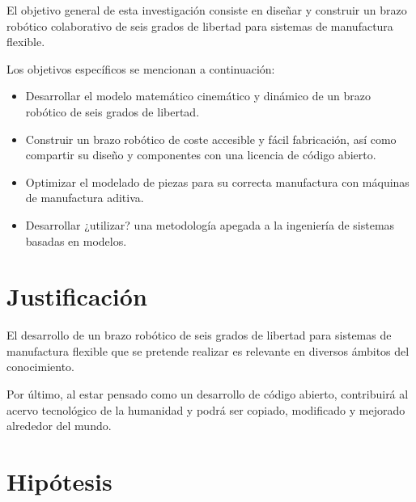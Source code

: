 El objetivo general de esta investigación consiste en diseñar y construir un brazo robótico colaborativo de seis grados de libertad para sistemas de manufactura flexible.

Los objetivos específicos se mencionan a continuación:

\begin{itemize}
\item Desarrollar el modelo matemático cinemático y dinámico de un brazo robótico de seis grados de libertad.
\item Construir un brazo robótico de coste accesible y fácil fabricación, así como compartir su diseño y componentes con una licencia de código abierto. 
\item Optimizar el modelado de piezas para su correcta manufactura con máquinas de manufactura aditiva.
\item Desarrollar ¿utilizar? una metodología apegada a la ingeniería de sistemas basadas en modelos.
\end{itemize}

\section{Justificación}

El desarrollo de un brazo robótico de seis grados de libertad para sistemas de manufactura flexible que se pretende realizar es relevante en diversos ámbitos del conocimiento. 

Por último, al estar pensado como un desarrollo de código abierto, contribuirá al acervo tecnológico de la humanidad y podrá ser copiado, modificado y mejorado alrededor del mundo. 


\section{Hipótesis}

